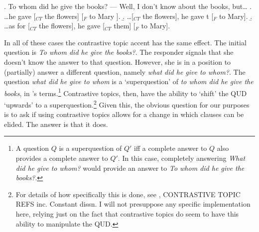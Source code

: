 \documentclass[11pt,letterpaper]{article}
\begin{document}
\ex. 	To whom did he give the books? ---  Well, I don't know about the books, but\ldots
	\a. \ldots he gave [$_{CT}$ the flowers] [$_{F}$ to Mary ].
	\b. \ldots [$_{CT}$ the flowers], he gave t [$_{F}$ to Mary].
	\b. \ldots as for [$_{CT}$ the flowers], he gave [$_{CT}$ them] [$_{F}$ to Mary].
	
In all of these cases the contrastive topic accent has the same effect.
The initial question is {\it To whom did he give the books?}.
The responder signals that she doesn't know the answer to that question.
However, she is in a position to (partially) answer a different question, namely {\it what did he give to whom?}.
The question {\it what did he give to whom} is a `superquestion' of {\it to whom did he give the books}, in \cite{RoQUD}'s terms.\footnote{A question $Q$ is a superquestion of $Q'$ iff a complete answer to $Q$ also provides a complete answer to $Q'$.
In this case, completely answering {\it What did he give to whom?} would provide an answer to {\it To whom did he give the books?}.}
Contrastive topics, then, have the ability to `shift' the QUD `upwards' to a superquestion.\footnote{For details of how specifically this is done, see \cite{RoQUD}, CONTRASTIVE TOPIC REFS inc. Constant dissn. %
I will not presuppose any specific implementation here, relying just on the fact that contrastive topics do seem to have this ability to manipulate the QUD.}
Given this, the obvious question for our purposes is to ask if using contrastive topics allows for a change in which clauses can be elided.
The answer is that it does.

\end{document}
